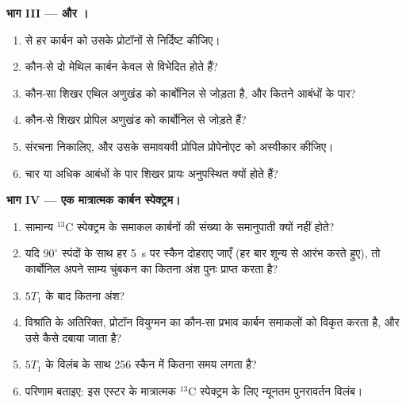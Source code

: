 \begin{problem}
\medskip\noindent\textbf{भाग III ---  और ।}
\begin{enumerate}[resume]
  \item {} से हर कार्बन को उसके प्रोटॉनों से निर्दिष्ट कीजिए।
  \item कौन-से दो मेथिल कार्बन केवल  से विभेदित होते हैं?
  \item कौन-सा  शिखर एथिल अणुखंड को कार्बोनिल से जोड़ता है, और
        कितने आबंधों के पार?
  \item कौन-से  शिखर प्रोपिल अणुखंड को कार्बोनिल से जोड़ते हैं?
  \item संरचना निकालिए, और उसके समावयवी प्रोपिल प्रोपेनोएट को अस्वीकार कीजिए।
  \item चार या अधिक आबंधों के पार  शिखर प्रायः अनुपस्थित क्यों होते हैं?
\end{enumerate}

\medskip\noindent\textbf{भाग IV --- एक मात्रात्मक कार्बन स्पेक्ट्रम।}
\begin{enumerate}[resume]
  \item सामान्य ${}^{13}$C स्पेक्ट्रम के समाकल कार्बनों की संख्या के समानुपाती
        क्यों नहीं होते?
  \item यदि $90^\circ$ स्पंदों के साथ हर \qty{5}{s} पर स्कैन दोहराए जाएँ (हर बार
        शून्य से आरंभ करते हुए), तो कार्बोनिल अपने साम्य चुंबकन का कितना अंश पुनः प्राप्त करता है?
  \item $5T_1$ के बाद कितना अंश?
  \item विश्रांति के अतिरिक्त, प्रोटॉन वियुग्मन का कौन-सा प्रभाव कार्बन
        समाकलों को विकृत करता है, और उसे कैसे दबाया जाता है?
  \item $5T_1$ के विलंब के साथ 256 स्कैन में कितना समय लगता है?
  \item परिणाम बताइए: इस एस्टर के मात्रात्मक ${}^{13}$C स्पेक्ट्रम के लिए
        न्यूनतम पुनरावर्तन विलंब।
\end{enumerate}
\end{problem}

